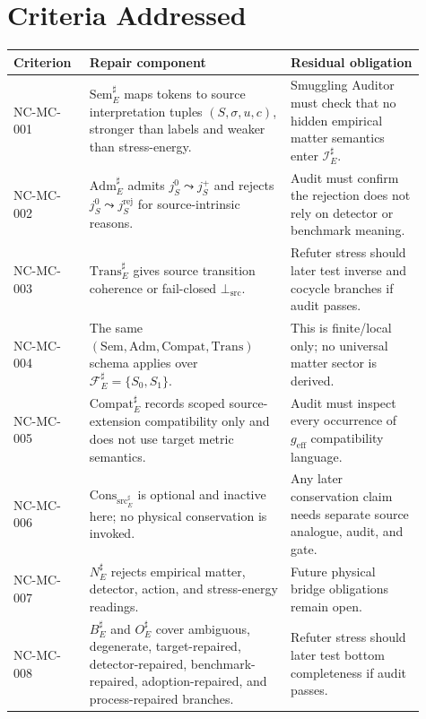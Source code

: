 \documentclass[11pt]{article}
\newcommand{\geff}{g_{\mathrm{eff}}}
\newcommand{\BottomSrc}{\bot_{\mathrm{src}}}
\newcommand{\Sem}{\mathrm{Sem}}
\newcommand{\Adm}{\mathrm{Adm}}
\newcommand{\Trans}{\mathrm{Trans}}
\newcommand{\Compat}{\mathrm{Compat}}
\newcommand{\ConsSrc}{\mathrm{Cons}_{\mathrm{src}}}
\newcommand{\Fsrc}{\mathcal{F}_{E}^{\sharp}}
\begin{document}
\section{Criteria Addressed}

\begin{longtable}{p{0.16\linewidth}p{0.45\linewidth}p{0.30\linewidth}}
\toprule
Criterion & Repair component & Residual obligation \\
\midrule
NC-MC-001 &
\(\Sem_E^{\sharp}\) maps tokens to source interpretation tuples
\((S,\sigma,u,c)\), stronger than labels and weaker than stress-energy. &
Smuggling Auditor must check that no hidden empirical matter semantics enter
\(\mathcal{I}_E^{\sharp}\). \\
\addlinespace
NC-MC-002 &
\(\Adm_E^{\sharp}\) admits \(j_S^0\leadsto j_S^+\) and rejects
\(j_S^0\leadsto j_S^{\mathrm{rej}}\) for source-intrinsic reasons. &
Audit must confirm the rejection does not rely on detector or benchmark
meaning. \\
\addlinespace
NC-MC-003 &
\(\Trans_E^{\sharp}\) gives source transition coherence or fail-closed
\(\BottomSrc\). &
Refuter stress should later test inverse and cocycle branches if audit passes. \\
\addlinespace
NC-MC-004 &
The same \((\Sem,\Adm,\Compat,\Trans)\) schema applies over
\(\Fsrc=\{S_0,S_1\}\). &
This is finite/local only; no universal matter sector is derived. \\
\addlinespace
NC-MC-005 &
\(\Compat_E^{\sharp}\) records scoped source-extension compatibility only and
does not use target metric semantics. &
Audit must inspect every occurrence of \(\geff\) compatibility language. \\
\addlinespace
NC-MC-006 &
\(\ConsSrc_E^{\sharp}\) is optional and inactive here; no physical
conservation is invoked. &
Any later conservation claim needs separate source analogue, audit, and gate. \\
\addlinespace
NC-MC-007 &
\(N_E^{\sharp}\) rejects empirical matter, detector, action, and
stress-energy readings. &
Future physical bridge obligations remain open. \\
\addlinespace
NC-MC-008 &
\(B_E^{\sharp}\) and \(O_E^{\sharp}\) cover ambiguous, degenerate,
target-repaired, detector-repaired, benchmark-repaired, adoption-repaired, and
process-repaired branches. &
Refuter stress should later test bottom completeness if audit passes. \\
\bottomrule
\end{longtable}
\end{document}
